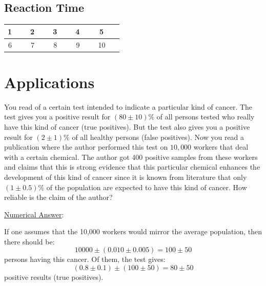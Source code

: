 \documentclass{article}
\begin{document}
\subsection{Reaction Time}

\begin{tabular}[h]{|c|c|c|c|c|c|c|c|c|c|}
    \hline
    1\ & \hspace{1.5cm} &2\ & \hspace{1.5cm} &3\ & \hspace{1.5cm} &4\ & \hspace{1.5cm} &5\ & \hspace{1.5cm} \\ \hline
    6\ & \hspace{1.5cm} &7\ & \hspace{1.5cm} &8\ & \hspace{1.5cm} &9\ & \hspace{1.5cm} &10\ & \hspace{1.5cm} \\ \hline
\end{tabular}

\section{Applications}

You read of a certain test intended to indicate a particular kind of cancer. The test gives you a positive result for $(80 \pm 10) \%$ of all persons tested who really have this kind of cancer (true positives). But the test also gives you a positive result for $(2 \pm 1) \%$ of all healthy persons (false positives). Now you read a publication where the author performed this test on $10,000$ workers that deal with a certain chemical. The author got 400 positive samples from these workers and claims that this is strong evidence that this particular chemical enhances the development of this kind of cancer since it is known from literature that only $(1 \pm 0.5)\%$ of the population are expected to have this kind of cancer. How reliable is the claim of the author?\myskip

\noindent \underline{Numerical Answer}:

If one assumes that the 10,000 workers would mirror the average population, then there should be:
\begin{equation}
    10000\pm(0.010 \pm 0.005) = 100 \pm 50
\end{equation}
persons having this cancer. Of them, the test gives:
\begin{equation}
    (0.8 \pm 0.1)\pm(100 \pm 50) = 80 \pm 50
\end{equation}
positive results (true positives).\myskip
\end{document}
